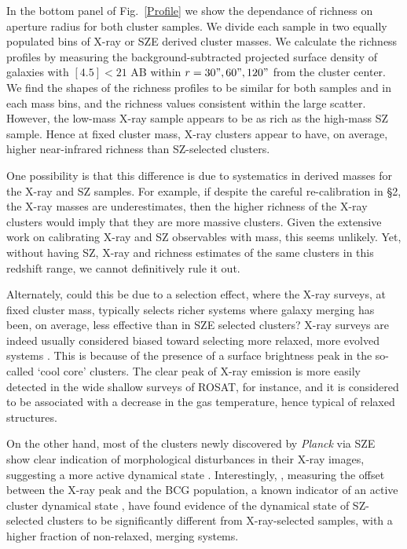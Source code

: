 \documentclass[apj,twocolumn]{emulateapj}
\begin{document}
{In the bottom panel of Fig.~\ref{Profile} we show the dependance of richness on aperture radius for both cluster samples. We divide each sample in two equally populated bins of X-ray or SZE derived cluster masses. We calculate the richness profiles by measuring the background-subtracted projected surface density of galaxies with $[4.5]<21$ AB  within $r= 30", 60" , 120"$ from the cluster center.
We find the shapes of the richness profiles to be similar for both samples and in each mass bins, and the richness values consistent within the large scatter. However, the low-mass X-ray sample appears to be as rich as the high-mass SZ sample. Hence at fixed cluster mass,  X-ray clusters appear to have, on average, higher near-infrared richness than SZ-selected clusters. 

One possibility is that this difference is due to systematics in derived masses for the X-ray and SZ samples. For example, if despite the careful re-calibration in \S 2, the X-ray masses are underestimates, then the higher richness of the X-ray clusters would imply that they are more massive clusters. Given the extensive work on calibrating X-ray and SZ observables with mass, this seems unlikely.
Yet, without having SZ, X-ray and richness estimates of the same clusters in this redshift range, we cannot definitively rule it out.

Alternately, could this be due to a selection effect, where the X-ray surveys, at fixed cluster mass, typically selects richer systems where galaxy merging has been, on average, less effective than in SZE selected clusters? X-ray surveys are indeed usually considered biased toward selecting more relaxed, more evolved systems \citep[e.g.,][]{Eckert11}.  This is because of the presence of a  surface brightness peak in the so-called `cool core' clusters. The clear peak of  X-ray emission is more easily detected in the wide shallow surveys of ROSAT, for instance, and it is considered to be associated with a decrease in the gas temperature,  hence typical of relaxed structures. 

On the other hand, most of the clusters newly discovered by {\it Planck} via SZE show clear indication of morphological disturbances in their X-ray images, suggesting a more  active dynamical state \citep{PlanckIX11}. Interestingly, \citet{Rossetti16}, measuring the offset between the X-ray peak and the BCG population, a known indicator of an active cluster dynamical state  \citep[e.g.,][]{Sanderson09, MannEbeling12}, have found evidence of the dynamical state of SZ-selected clusters to be significantly different from X-ray-selected samples, with a higher fraction of non-relaxed, merging systems.

}
\end{document}
